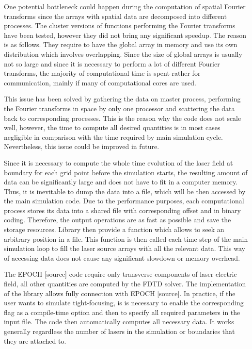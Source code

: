 One potential bottleneck could happen during the computation of spatial Fourier transforms since the arrays with spatial data are decomposed into different processes. The cluster versions of functions performing the Fourier transforms have been tested, however they did not bring any significant speedup. The reason is as follows. They require to have the global array in memory and use its own distribution which involves overlapping. Since the size of global arrays is usually not so large and since it is necessary to perform a lot of different Fourier transforms, the majority of computational time is spent rather for communication, mainly if many of computational cores are used.

This issue has been solved by gathering the data on master process, performing the Fourier transforms in space by only one processor and scattering the data back to corresponding processes. This is the reason why the code does not scale well, however, the time to compute all desired quantities is in most cases negligible in comparison with the time required by main simulation cycle. Nevertheless, this issue could be improved in future.

Since it is necessary to compute the whole time evolution of the laser field at boundary for each grid point before the simulation starts, the resulting amount of data can be significantly large and does not have to fit in a computer memory. Thus, it is inevitable to dump the data into a file, which will be then accessed by the main simulation code. Due to the performance purposes, each computational process stores its data into a shared file with corresponding offset and in binary coding. Therefore, the output operations are as fast as possible and save the storage resources. Library then provide a function which allows to seek an arbitrary position in a file. This function is then called each time step of the main simulation loop to fill the laser source arrays with all the relevant data. This way of accessing data does not cause any significant slowdown or memory overhead.

The EPOCH [source] code require only transverse components of laser electric field, all other quantities are computed by the FDTD solver. The implementation of the library allows fully connection with EPOCH [source]. In practice, if the user wants to simulate tight-focusing, is is necessary to enable the corresponding flag as a compile-time option and then to specify all required parameters in the input file. The code then automatically computes all necessary data. It works generally regardless the number of lasers in the simulation or boundaries that they are attached to.

